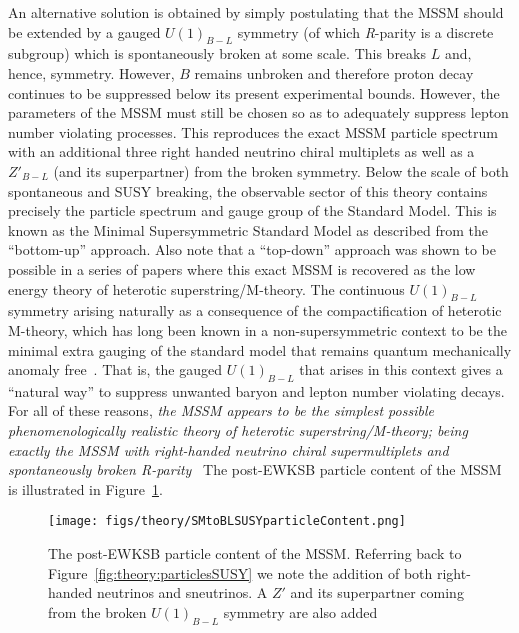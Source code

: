 An alternative solution is obtained by simply postulating that the MSSM should be extended by a gauged $U(1)_{B-L}$ symmetry (of which \emph{R}-parity is a discrete subgroup) which is spontaneously broken at some scale.
This breaks $L$ and, hence, \BL symmetry.
However, $B$ remains unbroken and therefore proton decay continues to be suppressed below its present experimental bounds.
However, the parameters of the \BL MSSM must still be chosen so as to adequately suppress lepton number violating processes.
This reproduces the exact MSSM particle spectrum with an additional three right handed neutrino chiral multiplets as well as a $Z'_{B-L}$ (and its superpartner) from the broken symmetry.
Below the scale of both spontaneous \BL and SUSY breaking, the observable sector of this theory contains precisely the particle spectrum and gauge group of the Standard Model.
This is known as the \BL Minimal Supersymmetric Standard Model as described from the ``bottom-up'' approach.
Also note that a ``top-down'' approach was shown to be possible in a series of papers \cite{Ambroso:2009sc,Ambroso:2010pe,Braun:2005nv,Ovrut:2014rba,Ovrut:2012wg,Ovrut:2015uea,Ambroso:2009jd} where this exact \BL MSSM is recovered as the low energy theory of heterotic superstring/M-theory.
The continuous $U(1)_{B-L}$ symmetry arising naturally as a consequence of the compactification of heterotic M-theory, which has long been known in a non-supersymmetric context to be the minimal extra gauging of the standard model that remains quantum mechanically anomaly free~\cite{Dumitru:2018jyb}.
That is, the gauged $U(1)_{B-L}$ that arises in this context gives a ``natural way'' to suppress unwanted baryon and lepton number violating decays.
For all of these reasons, \emph{the \BL MSSM appears to be the simplest possible phenomenologically realistic theory of heterotic superstring/M-theory; being exactly the MSSM with right-handed
neutrino chiral supermultiplets and spontaneously broken R-parity}~\cite{Dumitru:2018nct}
The post-EWKSB particle content of the \BL MSSM is illustrated in Figure~\ref{fig:theory:particlesSUSYBL}. 
\begin{figure}[htb]
  \begin{center}
    \texttt{[image: figs/theory/SMtoBLSUSYparticleContent.png]}
  \end{center}
  \caption[Minimal SUSY \BL Model particle content]{The post-EWKSB particle content of the \BL MSSM.
  Referring back to Figure~\ref{fig:theory:particlesSUSY} we note the addition of both right-handed neutrinos and sneutrinos. 
  A $Z'$ and its superpartner coming from the broken $U(1)_{B-L}$ symmetry are also added~\cite{KEK:2021}}
  \label{fig:theory:particlesSUSYBL}
\end{figure}
